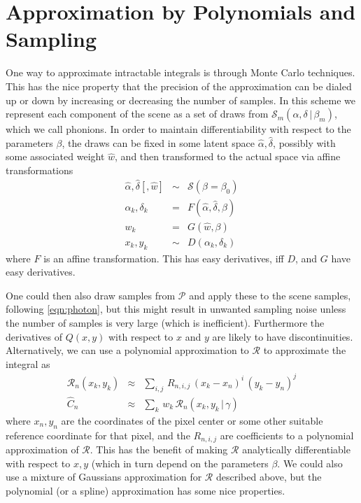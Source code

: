 \documentclass[modern]{aastex6}
\newcommand{\given}{\,|\,}
\newcommand{\countrate}{\hat{C}}
\newcommand{\psf}{\mathcal{P}}
\newcommand{\prf}{\mathcal{R}}
\newcommand{\qe}{Q}
\newcommand{\scene}{\mathcal{S}}
\begin{document}
\section{Approximation by Polynomials and Sampling}
One way to approximate intractable integrals is through Monte Carlo techniques.
This has the nice property that the precision of the approximation can be dialed up or down by increasing or decreasing the number of samples.
In this scheme we represent each component of the scene as a set of draws from $\scene_m(\alpha, \delta \given \beta_m)$, which we call phonions.
In order to maintain differentiability with respect to the parameters $\beta$, the draws can be fixed in some latent space $\hat{\alpha}, \hat{\delta}$,
possibly with some associated weight $\hat{w}$,
and then transformed to the actual space via affine transformations
\begin{eqnarray}
\hat{\alpha}, \hat{\delta} [, \hat{w}] & \sim & \scene(\beta=\beta_0) \\
\alpha_k, \delta_k & = & F(\hat{\alpha}, \hat{\delta}, \beta) \nonumber \\
w_k & = & G(\hat{w}, \beta) \nonumber \\
x_k, y_k & \sim & D(\alpha_k, \delta_k) \nonumber
\end{eqnarray}
where $F$ is an affine transformation. This has easy derivatives, iff $D$, and $G$ have easy derivatives.

One could then also draw samples from $\psf$ and apply these to the scene samples, following \ref{eqn:photon},
 but this might result in unwanted sampling noise unless the number of samples is very large (which is inefficient).
Furthermore the derivatives of $\qe(x, y)$ with respect to $x$ and $y$ are likely to have discontinuities.
Alternatively, we can use a polynomial approximation to $\prf$ to approximate the integral as
\begin{eqnarray}
\prf_n(x_k, y_k) & \approx & \sum_{i,j} \, R_{n, i, j} \, (x_k - x_n)^i \, (y_k - y_n)^j \\
\countrate_n & \approx & \sum_k \, w_k \, \prf_n(x_k, y_k \given \gamma) \nonumber
\end{eqnarray}
where $x_n, y_n$ are the coordinates of the pixel center or some other suitable reference coordinate for that pixel, 
and the $R_{n,i,j}$ are coefficients to a polynomial approximation of $\prf$.
This has the benefit of making $\prf$ analytically differentiable with respect to $x, y$ (which in turn depend on the parameters $\beta$.
We could also use a mixture of Gaussians approximation for $\prf$ described above, but the polynomial  (or a spline) approximation has some nice properties.
\end{document}
